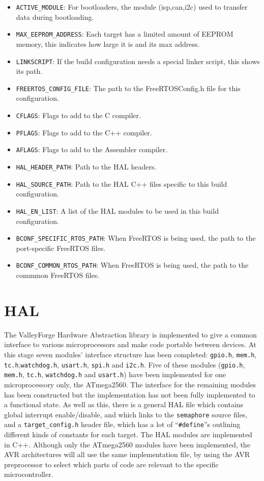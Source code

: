 \documentclass[a4paper, oneside, 11pt, titlepage, onecolumn, openright]{report}
\begin{document}
\begin{itemize}
\item \texttt{ACTIVE\_MODULE}: For bootloaders, the module (isp,can,i2c) used to transfer data during bootloading.
\item \texttt{MAX\_EEPROM\_ADDRESS}: Each target has a limited amount of EEPROM memory, this indicates how large it is and its max address.
\item \texttt{LINKSCRIPT}: If the build configuration needs a special linker script, this shows its path.
\item \texttt{FREERTOS\_CONFIG\_FILE}: The path to the FreeRTOSConfig.h file for this configuration.
\item \texttt{CFLAGS}: Flags to add to the C compiler.
\item \texttt{PFLAGS}: Flags to add to the C++ compiler.
\item \texttt{AFLAGS}: Flags to add to the Assembler compiler.
\item \texttt{HAL\_HEADER\_PATH}: Path to the HAL headers.
\item \texttt{HAL\_SOURCE\_PATH}: Path to the HAL C++ files specific to this build configuration.
\item \texttt{HAL\_EN\_LIST}: A list of the HAL modules to be used in this build configuration.
\item \texttt{BCONF\_SPECIFIC\_RTOS\_PATH}: When FreeRTOS is being used, the path to the port-specific FreeRTOS files.
\item \texttt{BCONF\_COMMON\_RTOS\_PATH}: When FreeRTOS is being used, the path to the commmon FreeRTOS files.
\end{itemize}
			
			
\chapter{HAL}
			\label{C:HAL}
			The ValleyForge Hardware Abstraction library is implemented to give a common interface to various microprocessors and make code portable between devices. \newline
			At this stage seven modules' interface structure has been completed: \texttt{gpio.h}, \texttt{mem.h}, \texttt{tc.h},\texttt{watchdog.h}, \texttt{usart.h}, \texttt{spi.h} and \texttt{i2c.h}. Five of these modules (\texttt{gpio.h}, \texttt{mem.h}, \texttt{tc.h}, \texttt{watchdog.h} and \texttt{usart.h}) have been implemented for one microprocessory only, the ATmega2560. The interface for the remaining modules has been constructed but the implementation has not been fully implemented to a functional state.\newline 
			As well as this, there is a general HAL file which contains global interrupt enable/disable, and which links to the \texttt{semaphore} source files, and a \texttt{target\_config.h} header file, which has a lot of ``\texttt{\#define}''s outlining different kinds of constants for each target.\newline
			The HAL modules are implemented in C++.\newline
			Although only the ATmega2560 modules have been implemented, the AVR architectures will all use the same implementation file, by using the AVR preprocessor to select which parts of code are relevant to the specific microcontroller.
			
\end{document}
